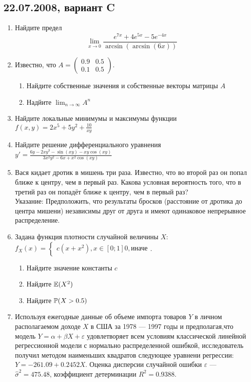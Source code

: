 \documentclass[pdftex,12pt,a4paper]{article}
\begin{document}
\subsection{22.07.2008, вариант C}
\begin{enumerate}
\item  Найдите предел 
\begin{equation}
\lim_{x\to 0} \frac{e^{7x}+4e^{5x}-5e^{-4x}}{\arcsin \left(\arcsin(6x)\right)}
\end{equation}
\item Известно, что $A=
\left(\begin{array}{cc}
0.9 & 0.5\\
0.1 & 0.5
\end{array}\right)$.
\begin{enumerate}
\item Найдите собственные значения и собственные векторы матрицы $A$
\item Надйите $\lim_{n\to \infty} A^n$
\end{enumerate}
\item Найдите локальные минимумы и максимумы функции $f(x,y)=2x^5+5y^2+\frac{10}{xy}$\\
\item Найдите решение дифференциального уравнения $y'=\frac{6y-2xy^3-\sin(xy)-xy\cos(xy)}{3x^2y^2-6x+x^2\cos(xy)}$\\
\item Вася кидает дротик в мишень три раза. Известно, что во второй раз он попал ближе к центру, чем в первый раз. Какова условная вероятность того, что в третий раз он попадёт ближе к центру, чем в первый раз?\\
Указание: Предположить, что результаты бросков (расстояние от дротика до центра мишени) независимы друг от друга и имеют одинаковое непрерывное распределение.\\
\item Задана функция плотности случайной величины $X$:\\
$f_X(x)=\begin{cases}
c(x+x^2), x \in [0;1]
0, \text{иначе}
\end{cases}$.
\begin{enumerate}
\item Найдите значение константы $c$
\item Найдите  $\E(X^2)$
\item Найдите $\P(X>0.5)$
\end{enumerate}
\item Используя ежегодные данные об объеме импорта товаров $Y$ в личном располагаемом доходе $X$ в США за 1978 --- 1997 годы и предполагая,что модель $Y=\alpha+\beta X+\varepsilon$ удовлетворяет всем условиям классической линейной регрессионной модели с нормально распределенной ошибкой, исследователь получил методом наименьших квадратов следующее уравнени регрессии: $Y=-261.09+0.2452X$. Оценка дисперсии случайной ошибки $\varepsilon$ --- $\hat{\sigma}^2=475.48$, коэффициент детерминации $R^2=0.9388$.

\end{enumerate}
\end{document}
